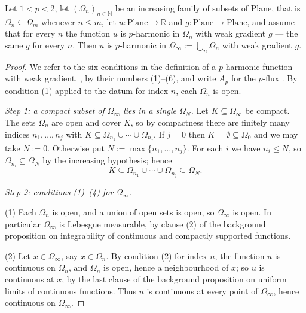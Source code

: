 \begin{lemma}
Let $1<p<2$, let $(\Omega_n)_{n\in\mathbb{N}}$ be an increasing family of subsets of
$\mathrm{Plane}$, that is $\Omega_n\subseteq\Omega_m$ whenever $n\le m$, let
$u\colon\mathrm{Plane}\to\mathbb{R}$ and $g\colon\mathrm{Plane}\to\mathrm{Plane}$, and assume
that for every $n$ the function $u$ is $p$-harmonic in $\Omega_n$ with weak gradient $g$ --- the
same $g$ for every $n$.  Then $u$ is $p$-harmonic in $\Omega_\infty:=\bigcup_{n}\Omega_n$ with
weak gradient $g$.
\end{lemma}
\begin{proof}
We refer to the six conditions in the definition of a $p$-harmonic function with weak gradient,
, by their numbers (1)--(6), and write $A_p$ for the $p$-flux .
By condition (1) applied to the datum for index $n$, each $\Omega_n$ is open.

\medskip\noindent\emph{Step 1: a compact subset of $\Omega_\infty$ lies in a single
$\Omega_N$.}
Let $K\subseteq\Omega_\infty$ be compact.  The sets $\Omega_n$ are open and cover $K$, so by
compactness there are finitely many indices $n_1,\ldots,n_j$ with
$K\subseteq\Omega_{n_1}\cup\cdots\cup\Omega_{n_j}$.  If $j=0$ then $K=\emptyset\subseteq\Omega_0$
and we may take $N:=0$.  Otherwise put $N:=\max\{n_1,\ldots,n_j\}$.  For each $i$ we have
$n_i\le N$, so $\Omega_{n_i}\subseteq\Omega_N$ by the increasing hypothesis; hence
\begin{equation}\label{eq:pue-one}
  K\subseteq\Omega_{n_1}\cup\cdots\cup\Omega_{n_j}\subseteq\Omega_N .
\end{equation}

\medskip\noindent\emph{Step 2: conditions (1)--(4) for $\Omega_\infty$.}

(1) Each $\Omega_n$ is open, and a union of open sets is open, so $\Omega_\infty$ is open.  In
particular $\Omega_\infty$ is Lebesgue measurable, by clause (2) of the background proposition
on integrability of continuous and compactly supported functions.

(2) Let $x\in\Omega_\infty$, say $x\in\Omega_n$.  By condition (2) for index $n$, the function
$u$ is continuous on $\Omega_n$, and $\Omega_n$ is open, hence a neighbourhood of $x$; so $u$ is
continuous at $x$, by the last clause of the background proposition on uniform limits of
continuous functions.  Thus $u$ is continuous at every point of $\Omega_\infty$, hence
continuous on $\Omega_\infty$.


\end{proof}
